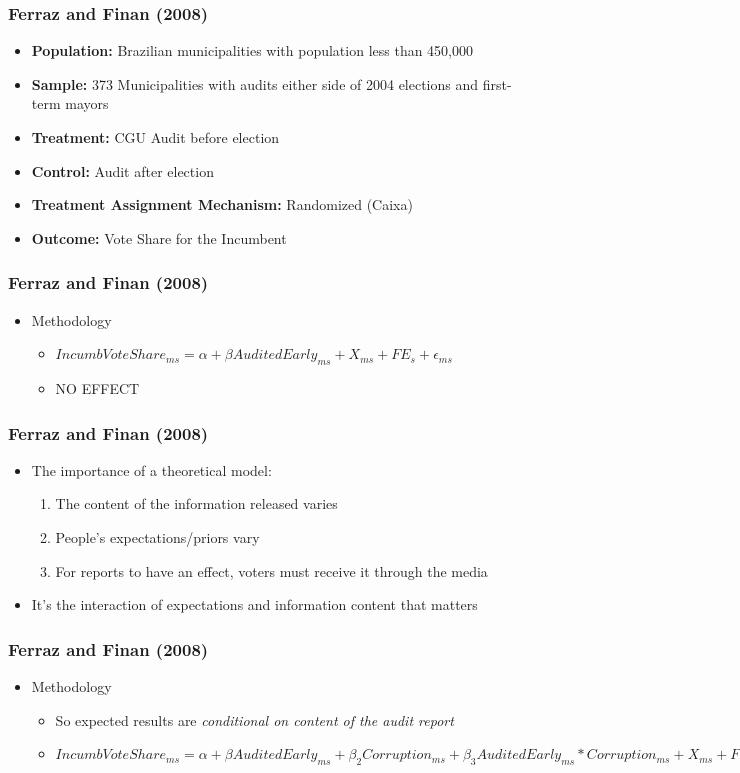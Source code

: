 \documentclass[xcolor=x11names,compress]{beamer}\usepackage[]{graphicx}\usepackage[]{color}
\renewcommand{\(}{\begin{columns}}
\renewcommand{\)}{\end{columns}}
\newcommand{\<}[1]{\begin{column}{#1}}
\renewcommand{\>}{\end{column}}
\begin{document}
\begin{frame}
\frametitle{Ferraz and Finan (2008)}
\begin{itemize}
\item \textbf{Population:} Brazilian municipalities with population less than 450,000
\item \textbf{Sample:} 373 Municipalities with audits either side of 2004 elections and first-term mayors
\item \textbf{Treatment:} CGU Audit before election
\item \textbf{Control:} Audit after election
\item \textbf{Treatment Assignment Mechanism:} Randomized (Caixa)
\item \textbf{Outcome:} Vote Share for the Incumbent
\end{itemize}
\end{frame}

\begin{frame}
\frametitle{Ferraz and Finan (2008)}
\begin{itemize}
\item Methodology
\begin{itemize}
\item $IncumbVoteShare_{ms} = \alpha + \beta AuditedEarly_{ms} + X_{ms} + FE_{s} + \epsilon_{ms}$
\pause
\item NO EFFECT
\end{itemize}
\end{itemize}
\end{frame}

\begin{frame}
\frametitle{Ferraz and Finan (2008)}
\begin{itemize}
\item The importance of a theoretical model:
\begin{enumerate}
\item The content of the information released varies
\item People's expectations/priors vary
\item For reports to have an effect, voters must receive it through the media
\end{enumerate}
\item It's the interaction of expectations and information content that matters
\end{itemize}
\end{frame}

\begin{frame}
\frametitle{Ferraz and Finan (2008)}
\begin{itemize}
\item Methodology
\begin{itemize}
\item So expected results are \textit{conditional on content of the audit report}
\pause
\item $IncumbVoteShare_{ms} = \alpha + \beta AuditedEarly_{ms} + \beta_2 Corruption_{ms} + \beta_3 AuditedEarly_{ms}*Corruption_{ms} + X_{ms} + FE_{s} + \epsilon_{ms}$
\end{itemize}
\end{itemize}
\end{frame}
\end{document}

